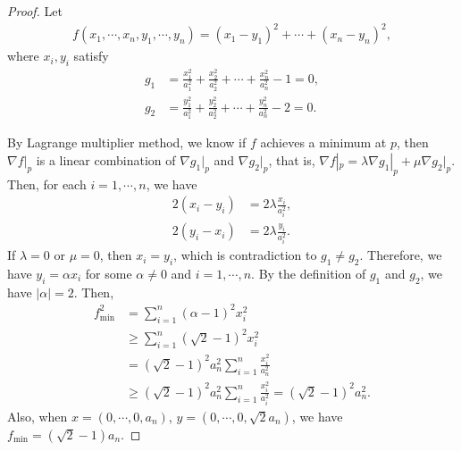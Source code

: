 \documentclass[11pt]{article}
\theoremstyle{definition}
\numberwithin{equation}{subsection}
\begin{document}
\begin{proof}
Let
\begin{align*}
    f(x_1, \cdots, x_n, y_1, \cdots, y_n) = (x_1 - y_1)^2 + \cdots + (x_n - y_n)^2,
\end{align*}
where $x_i, y_i$ satisfy
\begin{align*}
    g_1 & = \frac{x_1^2}{a_1^2} + \frac{x_2^2}{a_2^2} + \cdots + \frac{x_n^2}{a_n^2} - 1 = 0, \\
    g_2 & = \frac{y_1^2}{a_1^2} + \frac{y_2^2}{a_2^2} + \cdots + \frac{y_n^2}{a_n^2} - 2 = 0.
\end{align*}

By Lagrange multiplier method, we know if $f$ achieves a minimum at $p$, then $\nabla f|_p$ is a linear combination of $\nabla g_1|_p$ and $\nabla g_2|_p$, that is, $\nabla f|_p = \lambda \nabla g_1|_p + \mu \nabla g_2|_p$. Then, for each $i = 1, \cdots, n$, we have
\begin{align*}
    2(x_i - y_i) & = 2 \lambda \frac{x_i}{a_i^2}, \\
    2(y_i - x_i) & = 2 \lambda \frac{y_i}{a_i^2}.
\end{align*}
If $\lambda = 0$ or $\mu = 0$, then $x_i = y_i$, which is contradiction to $g_1 \neq g_2$. Therefore, we have $y_i = \alpha x_i$ for some $\alpha \neq 0$ and $i = 1, \cdots, n$. By the definition of $g_1$ and $g_2$, we have $|\alpha| = 2$. Then,
\begin{align*}
    f_{\min}^2 & = \sum^n_{i=1} (\alpha - 1)^2 x_i^2 \\
    & \geq \sum^n_{i=1} (\sqrt{2} - 1)^2 x_i^2 \\
    & = (\sqrt{2} - 1)^2 a_n^2 \sum^n_{i=1} \frac{x_i^2}{a_n^2} \\
    & \geq (\sqrt{2} - 1)^2 a_n^2 \sum^n_{i=1} \frac{x_i^2}{a_i^2} = (\sqrt{2} - 1)^2 a_n^2.
\end{align*}
Also, when $x = (0, \cdots, 0, a_n)$, $y = (0, \cdots, 0, \sqrt{2}a_n)$, we have $f_{\min} = (\sqrt{2} - 1) a_n$.
\end{proof}

\medskip
\end{document}
